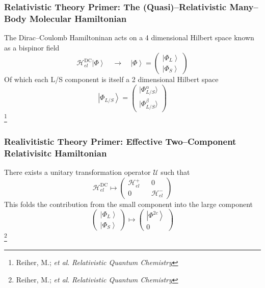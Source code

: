 \documentclass[usepdftitle=false,10pt]{beamer}
\newcommand{\ket}[1]{\left\vert #1 \right\rangle}         %
\newcommand*\op[1]{\mathcal{#1}}
\newcommand\blfootnote[1]{%
  \begingroup
  \renewcommand\thefootnote{}\footnote{#1}%
  \addtocounter{footnote}{-1}%
  \endgroup
}
\begin{document}
\begin{frame}
  \frametitle{Relativistic Theory Primer: The (Quasi)--Relativistic Many--Body 
  Molecular Hamiltonian}

  The Dirac--Coulomb Hamiltoninan acts on a 4 dimensional Hilbert space
  known as a bispinor field
  \begin{equation*}
    \op{H}_{el}^\mathrm{DC} \ket{\Phi} \quad \rightarrow \quad 
    \ket{\Phi} = \begin{pmatrix} \ket{\Phi_L} \\ \ket{\Phi_S} \end{pmatrix}
  \end{equation*}
  Of which each L/S component is itself a 2 dimensional Hilbert space
  \begin{equation*}
    \ket{\Phi_{L/S}} =
      \begin{pmatrix} \vert\Phi_{L/S}^\alpha\rangle \\ \vert\Phi_{L/S}^\beta\rangle
      \end{pmatrix}
  \end{equation*}
  \blfootnote{\tiny Reiher, M.; \emph{et al}. \emph{Relativistic Quantum Chemistry}}

\end{frame}

\begin{frame}
  \frametitle{Realivitistic Theory Primer: Effective Two--Component Relativisitc
  Hamiltonian}

  There exists a unitary transformation operator $\op{U}$ such that
  \begin{equation*}
    \op{H}_{el}^\mathrm{DC} \mapsto 
    \begin{pmatrix} \op{H}_{el}^+ && 0 \\ 0 && \op{H}_{el}^- \end{pmatrix} 
  \end{equation*}
  This folds the contribution from the small component into the large component 
  \begin{equation*}
    \begin{pmatrix} \ket{\Phi_L} \\ \ket{\Phi_S} \end{pmatrix}\mapsto
    \begin{pmatrix} \ket{\Phi^{2c}} \\ 0 \end{pmatrix}
  \end{equation*}
  \blfootnote{\tiny Reiher, M.; \emph{et al}. \emph{Relativistic Quantum Chemistry}}
\end{frame}
\end{document}
